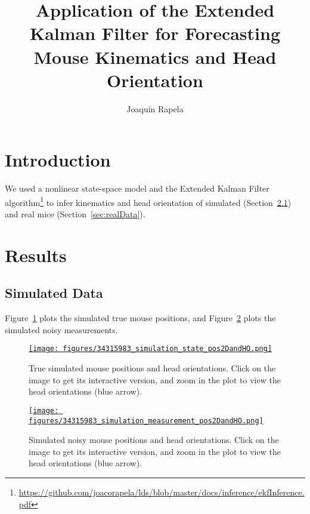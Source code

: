 \documentclass[12pt]{article}
\title{Application of the Extended Kalman Filter for Forecasting Mouse
Kinematics and Head Orientation}
\author{Joaqu\'{i}n Rapela}
\begin{document}
\maketitle

\tableofcontents

\section{Introduction}

We used a nonlinear state-space model and the Extended Kalman Filter
algorithm\footnote{\url{https://github.com/joacorapela/lds/blob/master/docs/inference/ekfInference.pdf}}
to infer kinematics and head orientation of simulated
(Section~\ref{sec:simulatedData}) and real mice (Section~\ref{sec:realData}).

\section{Results}

\subsection{Simulated Data}
\label{sec:simulatedData}

Figure~\ref{fig:sim_true} plots the simulated true mouse positions, and
Figure~\ref{fig:sim_measurements} plots the simulated noisy measurements.

\begin{figure}
    \centering
    \href{https://www.gatsby.ucl.ac.uk/~rapela/aman/reports/ekfForKinematicsAndHeadOrientation/figures/34315983_simulation_state_pos2DandHO.html}{\texttt{[image: figures/34315983\_simulation\_state\_pos2DandHO.png]}}
    \caption{True simulated mouse positions and head orientations. Click on
    the image to get its interactive version, and zoom in the plot to view the
    head orientations (blue arrow).}
    \label{fig:sim_true}
\end{figure}

\begin{figure}
    \centering
    \href{https://www.gatsby.ucl.ac.uk/~rapela/aman/reports/ekfForKinematicsAndHeadOrientation/figures/34315983_simulation_measurement_pos2DandHO.html}{\texttt{[image: figures/34315983\_simulation\_measurement\_pos2DandHO.png]}}
    \caption{Simulated noisy mouse positions and head orientations. Click on
    the image to get its interactive version, and zoom in the plot to view the
    head orientations (blue arrow).}
    \label{fig:sim_measurements}
\end{figure}
\end{document}
